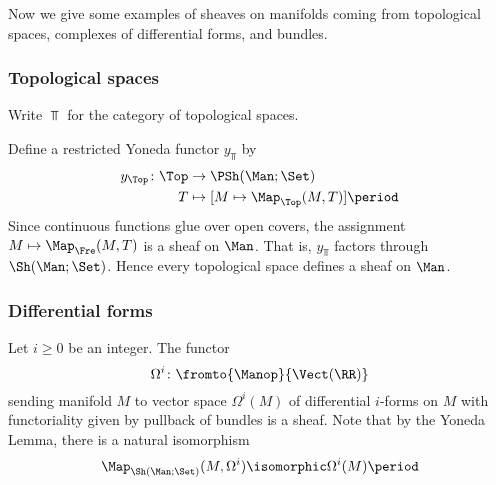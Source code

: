 Now we give some examples of sheaves on manifolds coming from topological spaces, complexes of differential forms, and bundles.


\subsubsection{Topological spaces}

\begin{notation}
	Write $ \Top $ for the category of topological spaces.
\end{notation}

\begin{construction}\label{ex:Topyoneda}
	Define a restricted Yoneda functor $ y_{\Top} $ by
	\begin{align*}
		y_{\Top} \colon \Top &\to \PSh(\Man;\Set) \\
		T &\mapsto [M \mapsto \Map_{\Top}(M,T)] \period
	\end{align*}
	Since continuous functions glue over open covers, the assignment $ M \mapsto \Map_{\Fre}(M,T) $ is a sheaf on $ \Man $.
	That is, $ y_{\Top} $ factors through $ \Sh(\Man;\Set) $.
	Hence every topological space defines a sheaf on $ \Man $.
\end{construction}



\subsubsection{Differential forms}

\begin{example}
	Let $ i \geq 0 $ be an integer.
	The functor
	\begin{equation*}
		\Omega^i \colon \fromto{\Manop}{\Vect(\RR)}
	\end{equation*} 
	sending manifold $ M $ to vector space $ \Omega^i(M) $ of differential $ i $-forms on $ M $ with functoriality given by pullback of bundles is a sheaf.
	Note that by the Yoneda Lemma, there is a natural isomorphism
	\begin{equation*}
		\Map_{\Sh(\Man;\Set)}(M,\Omega^i) \isomorphic \Omega^i(M) \period
	\end{equation*}
\end{example}

